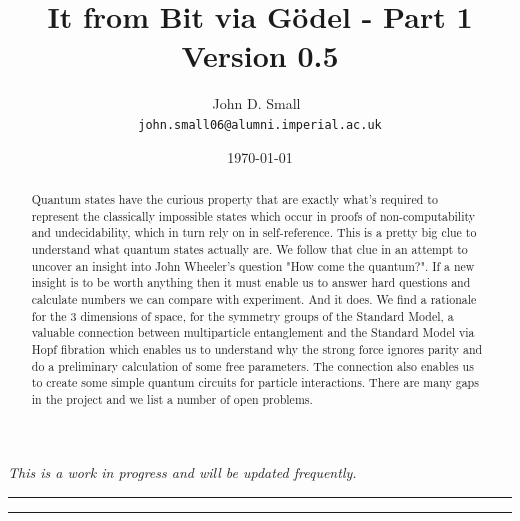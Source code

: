 \documentclass{article}
\title{It from Bit via Gödel - Part 1\\[0.4em]
  \large\normalfont Version 0.5}
\author{John D. Small\
  \\
  \small\texttt{john.small06@alumni.imperial.ac.uk}}
\date{\today}
\theoremstyle{plain}
\theoremstyle{definition}
\theoremstyle{remark}\newtheorem*{remark}{Remark}
\begin{document}
\maketitle
\begin{center}
  \itshape This is a work in progress and will be updated frequently.
\end{center}

\medskip

\noindent\rule{\textwidth}{0.4pt}
\begin{abstract}
  Quantum states have the curious property that are exactly what's required to represent the classically impossible states which occur in proofs of non-computability and undecidability, which in turn rely on in self-reference. This is a pretty big clue to understand what quantum states actually are. We follow that clue in an attempt to uncover an insight into John Wheeler's question "How come the quantum?". If a new insight is to be worth anything then it must enable us to answer hard questions and calculate numbers we can compare with experiment. And it does. We find a rationale for the 3 dimensions of space, for the symmetry groups of the Standard Model, a valuable connection between multiparticle entanglement and the Standard Model via Hopf fibration which enables us to  understand why the strong force ignores parity and do a preliminary calculation of some free parameters. The connection also enables us to create some simple quantum circuits for particle interactions. There are many gaps in the project and we list a number of open problems.
\end{abstract}
\noindent\rule{\textwidth}{0.4pt}
\end{document}
